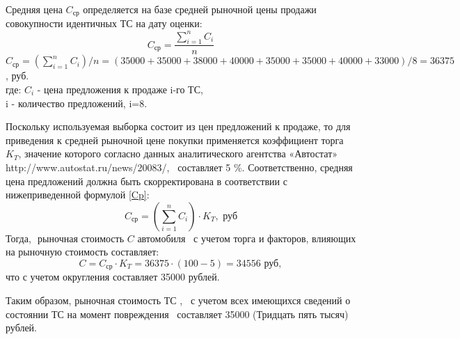 Средняя цена  $C_\text{ср}$  определяется на базе  средней рыночной цены продажи совокупности идентичных ТС на дату оценки: 
\begin{equation}\label{C}
C_\text{ср} =   \frac{ \sum\limits_{i=1}^n{C_i}}{n}
\end{equation}
 $C_\text{ср} =(\sum\limits_{i=1}^n{C_i})/n= (35000+35000+38000+40000+35000+35000+40000+33000)/8 =36 375 $, руб.\\
\noindent где: $ C_i $ - цена предложения к продаже i-го ТС, \\
\indent i - количество предложений, i=8.
\par Поскольку используемая выборка состоит из цен предложений к продаже, то для приведения к средней рыночной цене покупки применяется коэффициент торга $ K_T $, значение которого согласно данных аналитического агентства «Автостат» http://www.autostat.ru/news/20083/, %
\, составляет 5 \%. Соответственно, средняя цена предложений должна быть скорректирована в соответствии с нижеприведенной формулой \ref{Cp}:
\begin{equation}\label{Cp}
C_\text{ср} =  \left( \sum\limits_{i=1}^n{C_i}\right)  \cdot K_T , \,\, \text{руб}
\end{equation}
Тогда,\,\, рыночная стоимость $ C $ автомобиля  \, с учетом торга и факторов, влияющих на рыночную стоимость составляет: 
\begin{equation}\label{cp}
C = C_\text{ср} \cdot  K_T 
= 36375 \cdot(100-5)
=  34556 \, \, \text{руб},
\end{equation} 
\noindent что с учетом округления составляет 35000  рублей.

\par Таким образом, рыночная стоимость ТС , \, с учетом всех имеющихся сведений о состоянии ТС на момент повреждения \,  составляет 35000 (Тридцать пять тысяч) рублей.

